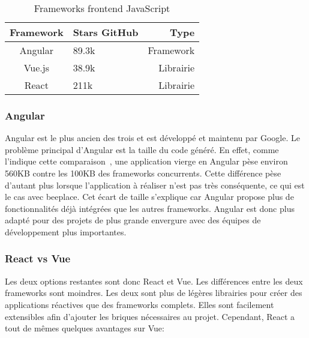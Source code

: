 \begin{table}[h]
  \begin{center}
    \caption{Frameworks frontend JavaScript}
    \label{tab:frameworks-frontend-js}
    \begin{tabular}{c|l|r}
      Framework & Stars GitHub       & Type      \\ \hline
      Angular   & 89.3k              & Framework \\
      Vue.js    & 38.9k\footnotemark & Librairie \\
      React     & 211k               & Librairie \\
    \end{tabular}
  \end{center}
\end{table}

\subsubsection{Angular}

Angular est le plus ancien des trois et est développé et maintenu par Google. Le problème principal d'Angular est la taille du code généré. En effet, comme l'indique cette comparaison~\cite{comparison-js-frameworks}, une application vierge en Angular pèse environ 560KB contre les 100KB des frameworks concurrents. Cette différence pèse d'autant plus lorsque l'application à réaliser n'est pas très conséquente, ce qui est le cas avec \gls{beeplace}. Cet écart de taille s'explique car Angular propose plus de fonctionnalités déjà intégrées que les autres frameworks. Angular est donc plus adapté pour des projets de plus grande envergure avec des équipes de développement plus importantes.

\subsubsection{React vs Vue}

Les deux options restantes sont donc React et Vue. Les différences entre les deux frameworks sont moindres. Les deux sont plus de légères librairies pour créer des applications réactives que des frameworks complets. Elles sont facilement extensibles afin d'ajouter les briques nécessaires au projet. Cependant, React a tout de mêmes quelques avantages sur Vue:

